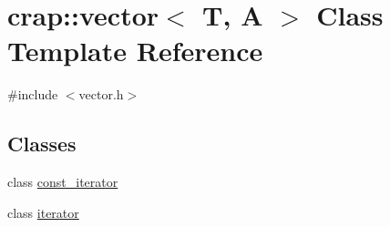 \hypertarget{classcrap_1_1vector}{\section{crap\+:\+:vector$<$ T, A $>$ Class Template Reference}
\label{classcrap_1_1vector}
}


{\ttfamily \#include $<$vector.\+h$>$}

\subsection*{Classes}
\begin{DoxyCompactItemize}
\item 
class \hyperlink{classcrap_1_1vector_1_1const__iterator}{const\+\_\+iterator}
\item 
class \hyperlink{classcrap_1_1vector_1_1iterator}{iterator}
\end{DoxyCompactItemize}
